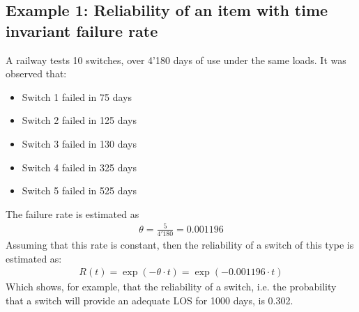 \subsection{Example 1: Reliability of an item with time invariant failure rate}
A railway tests 10 switches, over 4'180 days of use under the same loads. It was
observed that:
\begin{itemize}
	\item Switch 1 failed in 75 days
	\item Switch 2 failed in 125 days
	\item Switch 3 failed in 130 days
	\item Switch 4 failed in 325 days
	\item Switch 5 failed in 525 days
\end{itemize}
The failure rate is estimated as
\begin{eqnarray}
\theta  = \frac{5}{{4'180}} = 0.001196
\nonumber
\end{eqnarray}
Assuming that this rate is constant, then the reliability of a switch of this
type is estimated as:
\begin{eqnarray}
R(t) = \exp ( - \theta  \cdot t) = \exp ( - 0.001196 \cdot t)
\nonumber
\end{eqnarray}
Which shows, for example, that the reliability of a switch, i.e. the probability
that a switch will provide an adequate LOS for 1000 days, is 0.302.
